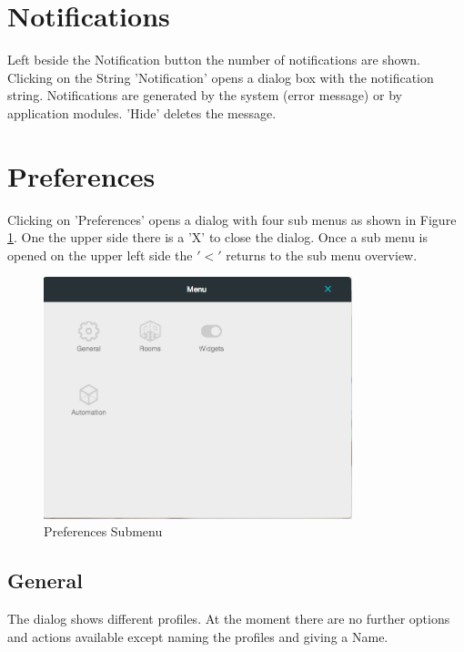 \section{Notifications}

Left beside the Notification button the number of notifications are shown. Clicking on 
the String 'Notification' opens a dialog box with the notification string. Notifications
are generated by the system (error message) or by application modules.
'Hide' deletes the message.

\section{Preferences}

Clicking on 'Preferences' opens a dialog with four sub menus as shown in Figure 
\ref{ha_prefs}. One the upper 
side there is a 'X' to close the dialog. Once a sub menu is opened on the 
upper left side the $'<'$ returns to the sub menu overview.

\begin{figure} 
\begin{center}
\includegraphics[width=0.8\textwidth]{pics/ha_preferences.png}
\caption{Preferences Submenu}
\label{ha_prefs}
\end{center} 
\end{figure}


\subsection{General}

The dialog shows different profiles. At the moment there are no further options 
and actions available except naming the profiles and giving a Name.


